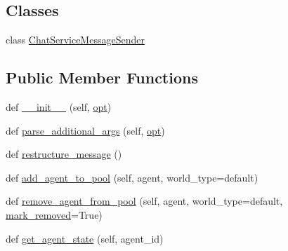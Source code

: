 \subsection*{Classes}
\begin{DoxyCompactItemize}
\item 
class \hyperlink{classparlai_1_1chat__service_1_1core_1_1chat__service__manager_1_1ChatServiceManager_1_1ChatServiceMessageSender}{Chat\+Service\+Message\+Sender}
\end{DoxyCompactItemize}
\subsection*{Public Member Functions}
\begin{DoxyCompactItemize}
\item 
def \hyperlink{classparlai_1_1chat__service_1_1core_1_1chat__service__manager_1_1ChatServiceManager_ac3c5275395694d74b18ff6d6f5e61f9d}{\+\_\+\+\_\+init\+\_\+\+\_\+} (self, \hyperlink{classparlai_1_1chat__service_1_1core_1_1chat__service__manager_1_1ChatServiceManager_a418cecffd5c3e0d6a00919eaa837d0e2}{opt})
\item 
def \hyperlink{classparlai_1_1chat__service_1_1core_1_1chat__service__manager_1_1ChatServiceManager_acf204463db3ea8e4a3929d5191890cbc}{parse\+\_\+additional\+\_\+args} (self, \hyperlink{classparlai_1_1chat__service_1_1core_1_1chat__service__manager_1_1ChatServiceManager_a418cecffd5c3e0d6a00919eaa837d0e2}{opt})
\item 
def \hyperlink{classparlai_1_1chat__service_1_1core_1_1chat__service__manager_1_1ChatServiceManager_a49a2a816f16454f0acb26e178cb104c8}{restructure\+\_\+message} ()
\item 
def \hyperlink{classparlai_1_1chat__service_1_1core_1_1chat__service__manager_1_1ChatServiceManager_a496b0f51b79bc2cd1a9be8fdc4cdd93d}{add\+\_\+agent\+\_\+to\+\_\+pool} (self, agent, world\+\_\+type=\textquotesingle{}default\textquotesingle{})
\item 
def \hyperlink{classparlai_1_1chat__service_1_1core_1_1chat__service__manager_1_1ChatServiceManager_a926a7c35369cb78cc81839cf2c7c1321}{remove\+\_\+agent\+\_\+from\+\_\+pool} (self, agent, world\+\_\+type=\textquotesingle{}default\textquotesingle{}, \hyperlink{classparlai_1_1chat__service_1_1core_1_1chat__service__manager_1_1ChatServiceManager_acd647091b75f07e2d3744b0d895c9d8c}{mark\+\_\+removed}=True)
\item 
def \hyperlink{classparlai_1_1chat__service_1_1core_1_1chat__service__manager_1_1ChatServiceManager_ac88107eb2a55878dad8ceb4c90acff5b}{get\+\_\+agent\+\_\+state} (self, agent\+\_\+id)

\end{DoxyCompactItemize}
